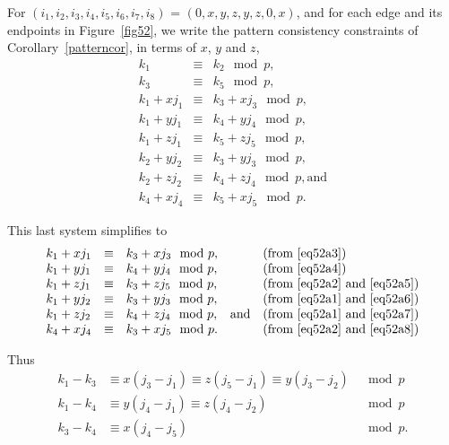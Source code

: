 For $(i_1,i_2,i_3,i_4,i_5,i_6,i_7,i_8)$ = $(0,x,y,z,y,z,0,x)$, and
for each edge and its endpoints in Figure~\ref{fig52}, we write the
pattern consistency constraints of Corollary~\ref{patterncor}, in
terms of $x$, $y$ and $z$,
\begin{subequations}\label{eq52a}\begin{eqnarray}
\label{eq52a1}k_1 &\equiv& k_2 \mod p,\\
\label{eq52a2}k_3 &\equiv& k_5 \mod p,\\
\label{eq52a3}k_1+xj_1 &\equiv& k_3+xj_3 \mod p, \\
\label{eq52a4}k_1+yj_1 &\equiv& k_4+yj_4 \mod p, \\
\label{eq52a5}k_1+zj_1 &\equiv& k_5+zj_5 \mod p, \\
\label{eq52a6}k_2+yj_2 &\equiv& k_3+yj_3 \mod p, \\
\label{eq52a7}k_2+zj_2 &\equiv& k_4+zj_4 \mod p, \text{and}\\
\label{eq52a8}k_4+xj_4 &\equiv& k_5+xj_5 \mod p.
\end{eqnarray}\end{subequations}

This last system simplifies to
\begin{equation}\label{eq52b}\begin{array}{llllll}
k_1+xj_1 &\equiv& k_3+xj_3 \mod p,& {}&\text{(from \eqref{eq52a3})}\\
k_1+yj_1 &\equiv& k_4+yj_4 \mod p,& {}&\text{(from \eqref{eq52a4})}\\
k_1+zj_1 &\equiv& k_3+zj_5 \mod p,& {}&\text{(from \eqref{eq52a2} and \eqref{eq52a5})}\\
k_1+yj_2 &\equiv& k_3+yj_3 \mod p,& {}&\text{(from \eqref{eq52a1} and \eqref{eq52a6})}\\
k_1+zj_2 &\equiv& k_4+zj_4 \mod p, &\text{and}&\text{(from \eqref{eq52a1} and \eqref{eq52a7})}\\
k_4+xj_4 &\equiv& k_3+xj_5 \mod p.&{}&\text{(from \eqref{eq52a2} and
\eqref{eq52a8})}
\end{array}\end{equation}

Thus
\begin{subequations}\begin{eqnarray}
\label{eq52s1}k_1-k_3 &\equiv x(j_3-j_1) \equiv z(j_5-j_1) \equiv
y(j_3-j_2) &
\mod p\\
\label{eq52s2}k_1-k_4 &\equiv y(j_4-j_1) \equiv z(j_4-j_2) &
\mod p\\
\label{eq52s3}k_3-k_4 &\equiv x(j_4-j_5) &\mod p.
\end{eqnarray}\end{subequations}

